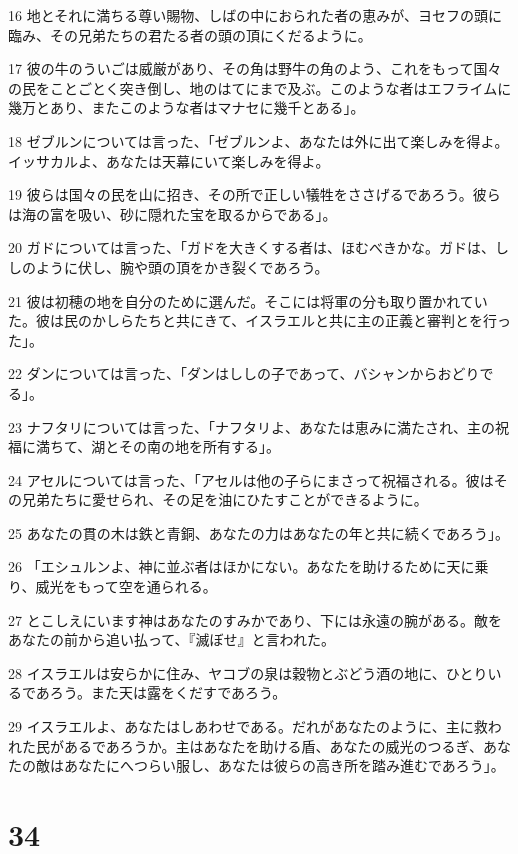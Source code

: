 \par 16 地とそれに満ちる尊い賜物、しばの中におられた者の恵みが、ヨセフの頭に臨み、その兄弟たちの君たる者の頭の頂にくだるように。
\par 17 彼の牛のういごは威厳があり、その角は野牛の角のよう、これをもって国々の民をことごとく突き倒し、地のはてにまで及ぶ。このような者はエフライムに幾万とあり、またこのような者はマナセに幾千とある」。
\par 18 ゼブルンについては言った、「ゼブルンよ、あなたは外に出て楽しみを得よ。イッサカルよ、あなたは天幕にいて楽しみを得よ。
\par 19 彼らは国々の民を山に招き、その所で正しい犠牲をささげるであろう。彼らは海の富を吸い、砂に隠れた宝を取るからである」。
\par 20 ガドについては言った、「ガドを大きくする者は、ほむべきかな。ガドは、ししのように伏し、腕や頭の頂をかき裂くであろう。
\par 21 彼は初穂の地を自分のために選んだ。そこには将軍の分も取り置かれていた。彼は民のかしらたちと共にきて、イスラエルと共に主の正義と審判とを行った」。
\par 22 ダンについては言った、「ダンはししの子であって、バシャンからおどりでる」。
\par 23 ナフタリについては言った、「ナフタリよ、あなたは恵みに満たされ、主の祝福に満ちて、湖とその南の地を所有する」。
\par 24 アセルについては言った、「アセルは他の子らにまさって祝福される。彼はその兄弟たちに愛せられ、その足を油にひたすことができるように。
\par 25 あなたの貫の木は鉄と青銅、あなたの力はあなたの年と共に続くであろう」。
\par 26 「エシュルンよ、神に並ぶ者はほかにない。あなたを助けるために天に乗り、威光をもって空を通られる。
\par 27 とこしえにいます神はあなたのすみかであり、下には永遠の腕がある。敵をあなたの前から追い払って、『滅ぼせ』と言われた。
\par 28 イスラエルは安らかに住み、ヤコブの泉は穀物とぶどう酒の地に、ひとりいるであろう。また天は露をくだすであろう。
\par 29 イスラエルよ、あなたはしあわせである。だれがあなたのように、主に救われた民があるであろうか。主はあなたを助ける盾、あなたの威光のつるぎ、あなたの敵はあなたにへつらい服し、あなたは彼らの高き所を踏み進むであろう」。

\chapter{34}

